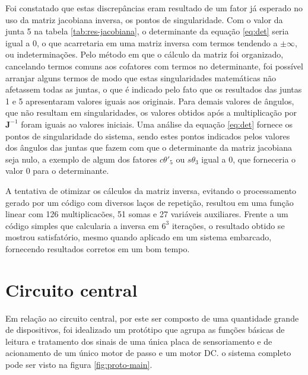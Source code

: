 Foi constatado que estas discrepâncias eram resultado de um fator já esperado no uso
da matriz jacobiana inversa, os pontos de singularidade. Com o valor da junta 5 na tabela
\ref{tab:res-jacobiana}, o determinante da equação \ref{eq:det} seria igual a 0, o que 
acarretaria em uma matriz inversa com termos tendendo a $\pm\infty$, ou indeterminações.
Pelo método em que o cálculo da matriz foi organizado, cancelando termos comuns aos cofatores com termos
no determinante, foi possível arranjar alguns termos de 
modo que estas singularidades matemáticas não afetassem todas as juntas, o que é indicado pelo
fato que os resultados das juntas 1 e 5 apresentaram valores iguais aos originais.
Para demais valores de ângulos, que não resultam em singularidades, os valores obtidos após
a multiplicação por $\textbf{J}^{-1}$ foram iguais ao valores iniciais. Uma análise da equação
\ref{eq:det} fornece os pontos de singularidade do sistema, sendo estes pontos indicados pelos 
valores dos ângulos das juntas que fazem com que o determinante da matriz jacobiana seja nulo, a exemplo de algum
dos fatores $c\theta'_5$ ou $s\theta_3$ igual a 0, que forneceria o valor 0 para o determinante. 

A tentativa de otimizar os cálculos da matriz inversa, evitando o processamento gerado
por um código com diversos laços de repetição, resultou em uma função linear com 126
multiplicacões, 51 somas e 27 variáveis auxiliares. Frente a um código simples que calcularia
a inversa em $6^3$ iterações, o resultado obtido se mostrou satisfatório, mesmo quando aplicado
em um sistema embarcado, fornecendo resultados corretos em um bom tempo.

\section{Circuito central}

Em relação ao circuito central, por este ser composto de uma quantidade grande de 
dispositivos, foi idealizado um protótipo que agrupa as funções básicas de leitura
e tratamento dos sinais de uma única placa de sensoriamento e de acionamento de um
único motor de passo e um motor DC. o sistema completo pode ser visto na figura
\ref{fig:proto-main}.

